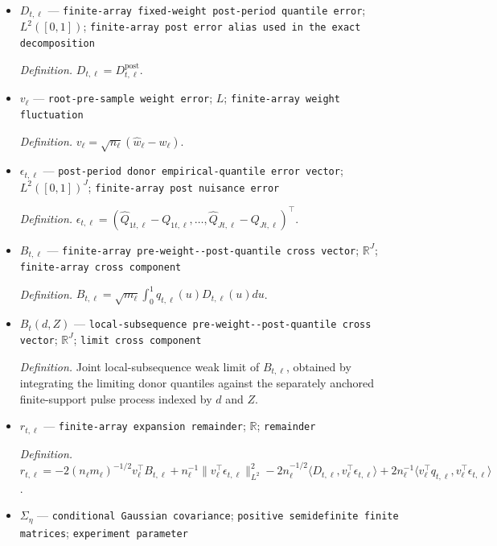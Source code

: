\documentclass{article}
\begin{document}
\begin{itemize}
  \item \(D_{t,\ell}\) --- \texttt{finite-\allowbreak{}array fixed-\allowbreak{}weight post-\allowbreak{}period quantile error}; \(L^2([0,1])\); \texttt{finite-\allowbreak{}array post error alias used in the exact decomposition}
  \par\smallskip\noindent\emph{Definition.} \(D_{t,\ell}=D^{\mathrm{post}}_{t,\ell}\).
  \item \(v_\ell\) --- \texttt{root-\allowbreak{}pre-\allowbreak{}sample weight error}; \(L\); \texttt{finite-\allowbreak{}array weight fluctuation}
  \par\smallskip\noindent\emph{Definition.} \(v_\ell=\sqrt{n_\ell}(\widehat w_\ell-w_\ell)\).
  \item \(\epsilon_{t,\ell}\) --- \texttt{post-\allowbreak{}period donor empirical-\allowbreak{}quantile error vector}; \(L^2([0,1])^J\); \texttt{finite-\allowbreak{}array post nuisance error}
  \par\smallskip\noindent\emph{Definition.} \(\epsilon_{t,\ell}=(\widehat Q_{1t,\ell}-Q_{1t,\ell},\ldots,\widehat Q_{Jt,\ell}-Q_{Jt,\ell})^\top\).
  \item \(B_{t,\ell}\) --- \texttt{finite-\allowbreak{}array pre-\allowbreak{}weight-\allowbreak{}-\allowbreak{}post-\allowbreak{}quantile cross vector}; \(\mathbb R^J\); \texttt{finite-\allowbreak{}array cross component}
  \par\smallskip\noindent\emph{Definition.} \(B_{t,\ell}=\sqrt{m_\ell}\int_0^1q_{t,\ell}(u)D_{t,\ell}(u)du\).
  \item \(B_t(d,Z)\) --- \texttt{local-\allowbreak{}subsequence pre-\allowbreak{}weight-\allowbreak{}-\allowbreak{}post-\allowbreak{}quantile cross vector}; \(\mathbb R^J\); \texttt{limit cross component}
  \par\smallskip\noindent\emph{Definition.} Joint local-subsequence weak limit of \(B_{t,\ell}\), obtained by integrating the limiting donor quantiles against the separately anchored finite-support pulse process indexed by \(d\) and \(Z\).
  \item \(r_{t,\ell}\) --- \texttt{finite-\allowbreak{}array expansion remainder}; \(\mathbb R\); \texttt{remainder}
  \par\smallskip\noindent\emph{Definition.} \(r_{t,\ell}=-2(n_\ell m_\ell)^{-1/2}v_\ell^\top B_{t,\ell}+n_\ell^{-1}\|v_\ell^\top\epsilon_{t,\ell}\|_{L^2}^2-2n_\ell^{-1/2}\langle D_{t,\ell},v_\ell^\top\epsilon_{t,\ell}\rangle+2n_\ell^{-1}\langle v_\ell^\top q_{t,\ell},v_\ell^\top\epsilon_{t,\ell}\rangle\).
  \item \(\Sigma_\eta\) --- \texttt{conditional Gaussian covariance}; \texttt{positive semidefinite finite matrices}; \texttt{experiment parameter}

\end{itemize}
\end{document}
